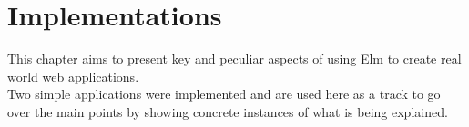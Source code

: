 \chapter{Implementations}

This chapter aims to present key and peculiar aspects of using Elm to create real world web applications.\\ Two simple applications were implemented and are used here as a track to go over the main points by showing concrete instances of what is being explained.



